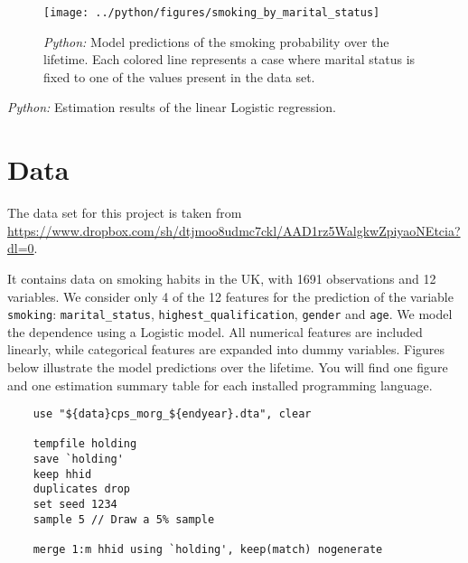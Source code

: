 \documentclass[11pt, a4paper, leqno]{article}
\begin{document}
\begin{figure}[H]

    \centering
    \texttt{[image: ../python/figures/smoking\_by\_marital\_status]}

    \caption{\emph{Python:} Model predictions of the smoking probability over the
        lifetime. Each colored line represents a case where marital status is fixed to one
        of the values present in the data set.}
    \label{fig:python-predictions}

\end{figure}


\begin{table}[!h]
    
    \caption{\label{tab:python-summary}\emph{Python:} Estimation results of the
        linear Logistic regression.}
\end{table}





\section{Data} %
\label{sec:data}

The data set for this project is taken from 
\url{https://www.dropbox.com/sh/dtjmoo8udmc7ckl/AAD1rz5WalgkwZpiyaoNEtcia?dl=0}.


It contains data on smoking habits in the UK, with 1691 observations and 12 variables.
We consider only 4 of the 12 features for the prediction of the variable
\texttt{smoking}: \texttt{marital\_status}, \texttt{highest\_qualification},
\texttt{gender} and \texttt{age}. We model the dependence using a Logistic model. All
numerical features are included linearly, while categorical features are expanded into
dummy variables. Figures below illustrate the model predictions over the lifetime. You
will find one figure and one estimation summary table for each installed programming
language.

\lstset{language=Stata}
\lstset{frame=lines}
\begin{lstlisting}
    use "${data}cps_morg_${endyear}.dta", clear

    tempfile holding
    save `holding'
    keep hhid
    duplicates drop
    set seed 1234
    sample 5 // Draw a 5% sample

    merge 1:m hhid using `holding', keep(match) nogenerate
\end{lstlisting}
\end{document}
